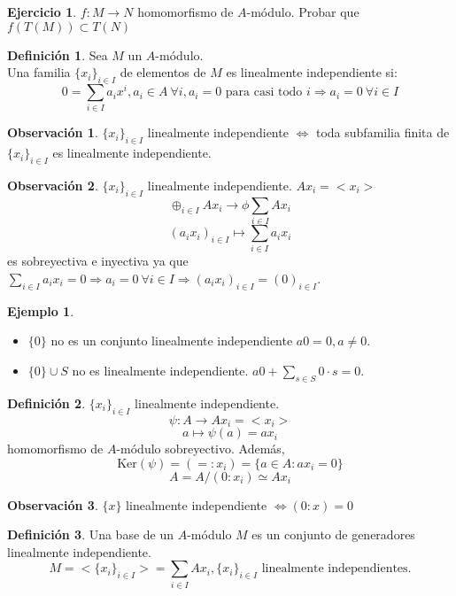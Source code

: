\documentclass{article}
\theoremstyle{theorem-style}  %
\theoremstyle{definition}
\newtheorem{definition}{Definición}[section]
\newtheorem*{observation}{Observación} %
\theoremstyle{example-style}
\newtheorem{example}{Ejemplo}[section]
\newtheorem{exercise}{Ejercicio}[section]
\begin{document}
\begin{exercise}
	$f: M \longrightarrow N$ homomorfismo de $ A $-módulo. Probar que $ f(T(M)) \subset T(N) $
\end{exercise}
\begin{definition}
	Sea $ M $ un $ A $-módulo.\\
	Una familia $ \{x_i\}_{i\in I} $ de elementos de $ M $ es linealmente independiente si:
	\[0=\sum_{i\in I}a_i x^i, a_i \in A \ \forall i, a_i =0 \text{ para casi todo }i \Rightarrow a_i =0 \ \forall i\in I \]
\end{definition}
\begin{observation}
	$ \{x_i\}_{i\in I} $ linealmente independiente $ \Leftrightarrow $ toda subfamilia finita de $ \{x_i\}_{i\in I} $ es linealmente independiente.
\end{observation}
\begin{observation}
	$ \{x_i\}_{i\in I} $ linealmente independiente.
		$ Ax_i = <x_i>$
		\[ \oplus_{i\in I}Ax_i \longrightarrow \phi \sum_{i\in I} A x_i \]
		\[ (a_i x_i)_{i\in I} \longmapsto \sum_{i\in I}a_i x_i \]  es sobreyectiva e inyectiva ya que $\sum_{i\in I}a_i x_i=0\Rightarrow a_i=0 \ \forall i\in I\Rightarrow (a_i x_i)_{i\in I} = (0)_{i\in I}$.
\end{observation}
\begin{example}
	\
	\begin{itemize}
		\item $ \{0\} $ no es un conjunto linealmente independiente $ a0=0, a\neq 0$.
		\item $ \{0\} \cup S$ no es linealmente independiente.	$ a0+\sum_{s\in S}0\cdot s =0 $.
	\end{itemize}
\end{example}
\begin{definition}
	$ \{x_i\}_{i\in I} $ linealmente independiente.
	\[ \psi:A\longrightarrow Ax_i=<x_i> \]
	\[ a\longmapsto \psi(a)=ax_i \]
	homomorfismo de $A$-módulo sobreyectivo. Además,
	\[ \text{Ker}(\psi)=(=:x_i)=\{a\in A : ax_i=0\} \]
	\[ A=A/(0:x_i)\simeq Ax_i \]
\end{definition}
	\begin{observation}
		$ \{x\} $ linealmente independiente $ \Leftrightarrow (0:x)=0$
	\end{observation}
\begin{definition}
	Una base de un $ A $-módulo $ M $ es un conjunto de generadores linealmente independiente.
	\[ M=<\{x_i\}_{i\in I}>=\sum_{i\in I} Ax_i, \{x_i\}_{i\in I} \text{ linealmente independientes.} \]
\end{definition}
\end{document}
